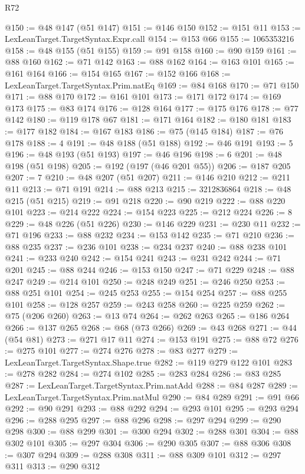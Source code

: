 \begin{lexlean}{R72}
\begin{coremodule}
@150 := @48 @147 (@51 @147)
@151 := @146 @150
@152 := @151 @11
@153 := LexLeanTarget.TargetSyntax.Expr.call
@154 := @153 @66
@155 := 1065353216
@158 := @48 @155 (@51 @155)
@159 := @91 @158
@160 := @90 @159
@161 := @88 @160
@162 := @71 @142
@163 := @88 @162
@164 := @163 @101
@165 := @161 @164
@166 := @154 @165
@167 := @152 @166
@168 := LexLeanTarget.TargetSyntax.Prim.natEq
@169 := @84 @168
@170 := @71 @150
@171 := @88 @170
@172 := @161 @101
@173 := @171 @172
@174 := @169 @173
@175 := @83 @174
@176 := @128 @164
@177 := @175 @176
@178 := @77 @142
@180 := @119 @178 @67
@181 := @171 @164
@182 := @180 @181
@183 := @177 @182
@184 := @167 @183
@186 := @75 (@145 @184)
@187 := @76 @178
@188 := 4
@191 := @48 @188 (@51 @188)
@192 := @46 @191
@193 := 5
@196 := @48 @193 (@51 @193)
@197 := @46 @196
@198 := 6
@201 := @48 @198 (@51 @198)
@205 := @192 (@197 (@46 @201 @55))
@206 := @187 @205
@207 := 7
@210 := @48 @207 (@51 @207)
@211 := @146 @210
@212 := @211 @11
@213 := @71 @191
@214 := @88 @213
@215 := 3212836864
@218 := @48 @215 (@51 @215)
@219 := @91 @218
@220 := @90 @219
@222 := @88 @220 @101
@223 := @214 @222
@224 := @154 @223
@225 := @212 @224
@226 := 8
@229 := @48 @226 (@51 @226)
@230 := @146 @229
@231 := @230 @11
@232 := @71 @196
@233 := @88 @232
@234 := @153 @142
@235 := @71 @210
@236 := @88 @235
@237 := @236 @101
@238 := @234 @237
@240 := @88 @238 @101
@241 := @233 @240
@242 := @154 @241
@243 := @231 @242
@244 := @71 @201
@245 := @88 @244
@246 := @153 @150
@247 := @71 @229
@248 := @88 @247
@249 := @214 @101
@250 := @248 @249
@251 := @246 @250
@253 := @88 @251 @101
@254 := @245 @253
@255 := @154 @254
@257 := @88 @255 @101
@258 := @128 @257
@259 := @243 @258
@260 := @225 @259
@262 := @75 (@206 @260)
@263 := @13 @74
@264 := @262 @263
@265 := @186 @264
@266 := @137 @265
@268 := @68 (@73 @266)
@269 := @43 @268
@271 := @44 (@54 @81)
@273 := @271 @17 @11
@274 := @153 @191
@275 := @88 @72
@276 := @275 @101
@277 := @274 @276
@278 := @83 @277
@279 := LexLeanTarget.TargetSyntax.Shape.true
@282 := @119 @279 @122 @101
@283 := @278 @282
@284 := @274 @102
@285 := @283 @284
@286 := @83 @285
@287 := LexLeanTarget.TargetSyntax.Prim.natAdd
@288 := @84 @287
@289 := LexLeanTarget.TargetSyntax.Prim.natMul
@290 := @84 @289
@291 := @91 @66
@292 := @90 @291
@293 := @88 @292
@294 := @293 @101
@295 := @293 @294
@296 := @288 @295
@297 := @88 @296
@298 := @297 @294
@299 := @290 @298
@300 := @88 @299
@301 := @300 @294
@302 := @288 @301
@304 := @88 @302 @101
@305 := @297 @304
@306 := @290 @305
@307 := @88 @306
@308 := @307 @294
@309 := @288 @308
@311 := @88 @309 @101
@312 := @297 @311
@313 := @290 @312

\end{coremodule}
\end{lexlean}
